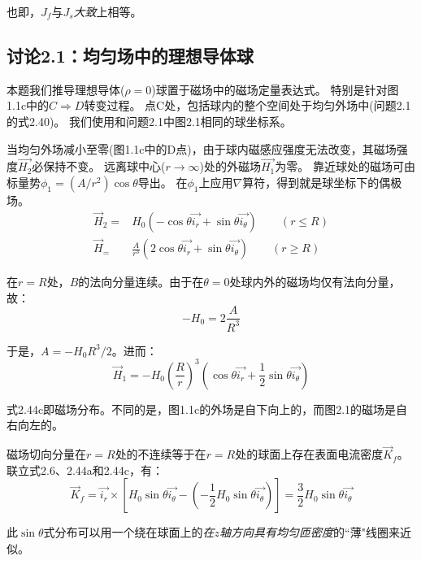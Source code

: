 也即，$J_f$与$J_s$\textit{大致}上相等。



\subsection{讨论2.1：均匀场中的理想导体球}
本题我们推导理想导体($\rho=0$)球置于磁场中的磁场定量表达式。
特别是针对图 1.1c中的$C\Rightarrow D$转变过程。
点C处，包括球内的整个空间处于均匀外场中(问题2.1的式2.40)。
我们使用和问题2.1中图2.1相同的球坐标系。

当均匀外场减小至零(图1.1c中的D点)，由于球内磁感应强度无法改变，其磁场强度$\vec{H_2}$必保持不变。
远离球中心($r\rightarrow \infty$)处的外磁场$\vec{H_1}$为零。
靠近球处的磁场可由标量势$\phi_1=(A/r^2)\cos\theta$导出。
在$\phi_1$上应用$\nabla$算符，得到就是球坐标下的偶极场。
\begin{subequations}
	\begin{align}
\vec{H}_2=&H_0 (-\cos\theta \vec{i_r}+\sin\theta \vec{i_\theta})  \qquad(r\le R) \\
\vec{H}_=&\frac{A}{r^3}(2\cos\theta \vec{i_r}+\sin\theta \vec{i_\theta})\qquad  (r\ge R)
	\end{align}
\end{subequations}

在$r=R$处，$B$的法向分量连续。由于在$\theta=0$处球内外的磁场均仅有法向分量，故：
\begin{equation*}
-H_0=2\frac{A}{R^3}
\end{equation*}

于是，$A=-H_0 R^3/2$。进而：
\begin{equation*}
\vec{H}_1=-H_0\left(\frac{R}{r}\right)^3 \left(\cos\theta \vec{i_r}+\frac{1}{2}\sin\theta \vec{i_\theta}\right) \tag{2.44c}
\end{equation*}


式2.44c即磁场分布。不同的是，图1.1c的外场是自下向上的，而图2.1的磁场是自右向左的。

磁场切向分量在$r=R$处的不连续等于在$r=R$处的球面上存在表面电流密度$\vec{K}_f$。
联立式2.6、2.44a和2.44c，有：
\begin{equation}
  \vec{K}_f=\vec{i_r}\times \left[H_0 \sin\theta \vec{i_\theta}-\left(-\frac{1}{2}H_0 \sin\theta \vec{i_\theta}\right)\right]=\frac{3}{2}H_0\sin\theta\vec{i_\theta}
\end{equation}

此$\sin\theta$式分布可以用一个绕在球面上的\textit{在$z$轴方向具有均匀匝密度}的``薄"线圈来近似。




